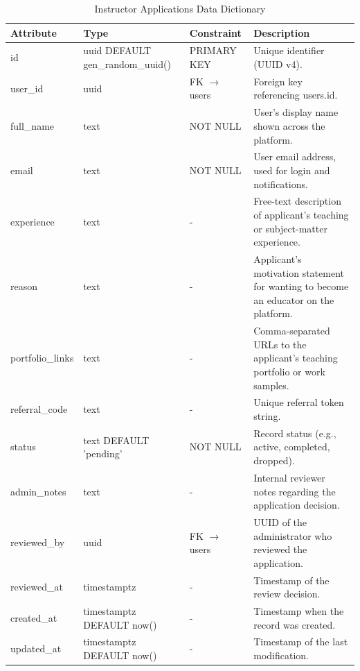 \documentclass[12pt, oneside]{article} %
\newcommand{\tabbreak}{\hyphenpenalty=200\exhyphenpenalty=200\tolerance=4000\hbadness=10000\hspace{0pt}}
\begin{document}
\begin{table}[H]
\caption{Instructor Applications Data Dictionary}
\label{tab:dd_instructor_applications}
\vspace{-4mm}
\begin{center}
\renewcommand{\arraystretch}{1.15}
\scriptsize
\begin{tabular}{|>{\raggedright\arraybackslash\tabbreak}p{2.67cm}|>{\raggedright\arraybackslash\tabbreak}p{2.93cm}|>{\raggedright\arraybackslash\tabbreak}p{2.67cm}|>{\raggedright\arraybackslash\tabbreak}p{4.51cm}|}
\hline
\textbf{Attribute} & \textbf{Type} & \textbf{Constraint} & \textbf{Description} \\ \hline
id & uuid DEFAULT gen\_random\_uuid() & PRIMARY KEY & Unique identifier (UUID v4). \\ \hline
user\_id & uuid & FK $\rightarrow$ users & Foreign key referencing users.id. \\ \hline
full\_name & text & NOT NULL & User's display name shown across the platform. \\ \hline
email & text & NOT NULL & User email address, used for login and notifications. \\ \hline
experience & text & - & Free-text description of applicant's teaching or subject-matter experience. \\ \hline
reason & text & - & Applicant's motivation statement for wanting to become an educator on the platform. \\ \hline
portfolio\_links & text & - & Comma-separated URLs to the applicant's teaching portfolio or work samples. \\ \hline
referral\_code & text & - & Unique referral token string. \\ \hline
status & text DEFAULT 'pending' & NOT NULL & Record status (e.g., active, completed, dropped). \\ \hline
admin\_notes & text & - & Internal reviewer notes regarding the application decision. \\ \hline
reviewed\_by & uuid & FK $\rightarrow$ users & UUID of the administrator who reviewed the application. \\ \hline
reviewed\_at & timestamptz & - & Timestamp of the review decision. \\ \hline
created\_at & timestamptz DEFAULT now() & - & Timestamp when the record was created. \\ \hline
updated\_at & timestamptz DEFAULT now() & - & Timestamp of the last modification. \\ \hline
\end{tabular}
\end{center}
\end{table}
\end{document}
